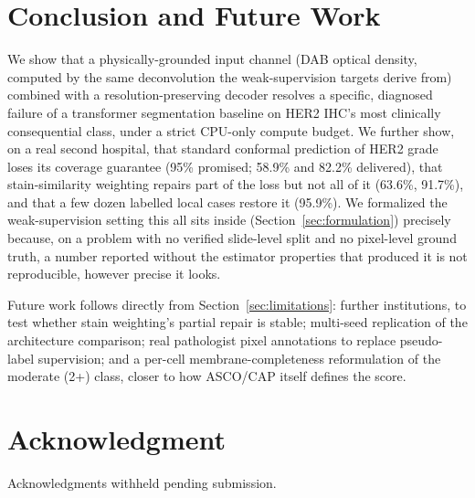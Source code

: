 \documentclass[conference]{IEEEtran}
\begin{document}
\section{Conclusion and Future Work}

We show that a physically-grounded input channel (DAB optical density,
computed by the same deconvolution the weak-supervision targets derive
from) combined with a resolution-preserving decoder resolves a specific,
diagnosed failure of a transformer segmentation baseline on HER2 IHC's most
clinically consequential class, under a strict CPU-only compute budget. We
further show, on a real second hospital, that standard conformal prediction of
HER2 grade loses its coverage guarantee (95\% promised; 58.9\% and 82.2\%
delivered), that stain-similarity weighting repairs part of the loss but not all of it
(63.6\%, 91.7\%), and that a few dozen labelled local cases restore it (95.9\%).
We formalized the weak-supervision setting this all sits
inside (Section~\ref{sec:formulation}) precisely because, on a problem
with no verified slide-level split and no pixel-level ground truth, a
number reported without the estimator properties that produced it is not
reproducible, however precise it looks.

Future work follows directly from Section~\ref{sec:limitations}: further
institutions, to test whether stain weighting's partial repair is stable;
multi-seed replication of the architecture comparison; real pathologist pixel
annotations to replace pseudo-label supervision; and a per-cell
membrane-completeness reformulation of the moderate (2+) class, closer to how
ASCO/CAP itself defines the score.

\section*{Acknowledgment}
Acknowledgments withheld pending submission.
\end{document}
